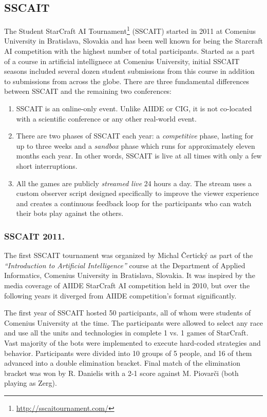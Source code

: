 \documentclass{llncs}
\begin{document}
\subsection{SSCAIT}\label{sec:SSCAIT}
The Student StarCraft AI Tournament\footnote{\url{http://sscaitournament.com/}} (SSCAIT) started in 2011 at Comenius University in Bratislava, Slovakia and has been well known for being the Starcraft AI competition with the highest number of total participants. Started as a part of a course in artificial intellignece at Comenius University, initial SSCAIT seasons included several dozen student submissions from this course in addition to submissions from across the globe. 
There are three fundamental differences between SSCAIT and the remaining two conferences:
\begin{enumerate}
  \item SSCAIT is an online-only event. Unlike AIIDE or CIG, it is not co-located with a scientific conference or any other real-world event.
  \item There are two phases of SSCAIT each year: a {\em competitive} phase, lasting for up to three weeks and a {\em sandbox} phase which runs for approximately eleven months each year. In other words, SSCAIT is live at all times with only a few short interruptions.
  \item All the games are publicly {\em streamed live} 24 hours a day. The stream uses a custom observer script \cite{mattsson2015automatic} designed specifically to improve the viewer experience and creates a continuous feedback loop for the participants who can watch their bots play against the others.
\end{enumerate}

\subsubsection{SSCAIT 2011.}
The first SSCAIT tournament was organized by Michal \v{C}ertick\'{y} as part of the {\em ``Introduction to Artificial Intelligence''} course at the Department of Applied Informatics, Comenius University in Bratislava, Slovakia. It was inspired by the media coverage of AIIDE StarCraft AI competition held in 2010, but over the following years it diverged from AIIDE competition's format significantly.

The first year of SSCAIT hosted 50 participants, all of whom were students of Comenius University at the time. The participants were allowed to select any race and use all the units and technologies in complete 1 vs. 1 games of StarCraft. Vast majority of the bots were implemented to execute hard-coded strategies and behavior. Participants were divided into 10 groups of 5 people, and 16 of them advanced into a double elimination bracket. Final match of the elimination bracket was won by R. Danielis with a 2-1 score against M. Piovar\v{c}i (both playing as Zerg).
\end{document}
